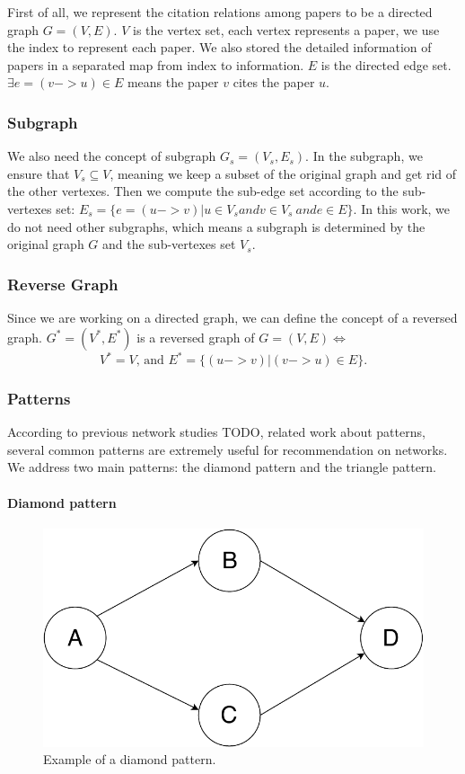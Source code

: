 First of all, we represent the citation relations among papers to be a directed graph $G=(V, E)$. $V$ is the vertex set, each vertex represents a paper, we use the index to represent each paper. We also stored the detailed information of papers in a separated map from index to information. $E$ is the directed edge set. $\exists e=(v -> u) \in E$ means the paper $v$ cites the paper $u$.

\subsubsection{Subgraph}
We also need the concept of subgraph $G_s = (V_s, E_s)$. In the subgraph, we ensure that $V_s \subseteq V$, meaning we keep a subset of the original graph and get rid of the other vertexes. Then we compute the sub-edge set according to the sub-vertexes set: $E_s = \{e=(u -> v) | u \in V_s and v \in V_s\ and e \in E\}$. In this work, we do not need other subgraphs, which means a subgraph is determined by the original graph $G$ and the sub-vertexes set $V_s$.

\subsubsection{Reverse Graph}
Since we are working on a directed graph, we can define the concept of a reversed graph. $G^*=(V^*, E^*)$ is a reversed graph of $G=(V, E)\iff $
\begin{equation}
 V^* = V \text{, and } E^* = \{(u -> v)| (v->u) \in E\}.
\end{equation}

\subsubsection{Patterns}

According to previous network studies {TODO, related work about patterns}, several common patterns are extremely useful for recommendation on networks. We address two main patterns: the diamond pattern and the triangle pattern. 

\paragraph{Diamond pattern}

\begin{figure}[t]
	\centering
	\includegraphics[width=0.7\linewidth]{diamond.pdf}
	\caption{Example of a diamond pattern.}
	\label{fig:diamond}
\end{figure}

